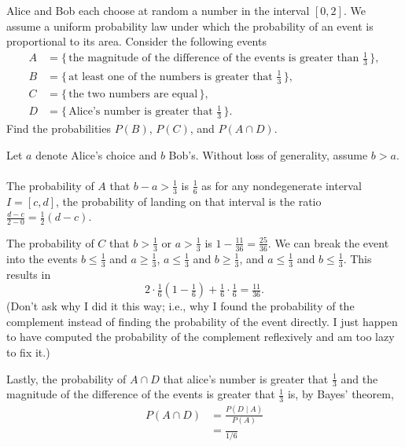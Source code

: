 \begin{problem}
  Alice and Bob each choose at random a number in the interval
  \([0,2]\). We assume a uniform probability law under which the
  probability of an event is proportional to its area. Consider the
  following events
  \begin{align*}
    A&=\bigl\{\,\text{the magnitude of the difference of the events is
       greater than \(\tfrac{1}{3}\)}\,\bigr\},\\
    B&=\bigl\{\,\text{at least one of the numbers is greater that
       \(\tfrac{1}{3}\)}\,\bigr\},\\
    C&=\bigl\{\,\text{the two numbers are equal}\,\bigr\},\\
    D&=\bigl\{\,\text{Alice's number is greater that \(\tfrac{1}{3}\)}\,\bigr\}.
  \end{align*}
  Find the probabilities \(P(B)\), \(P(C)\), and \(P(A\cap D)\).
\end{problem}
\begin{solution*}
  Let \(a\) denote Alice's choice and \(b\) Bob's. Without loss of
  generality, assume \(b>a\).
  \\\\
  The probability of \(A\) that \(b-a>\frac{1}{3}\) is \(\frac{1}{6}\) as
  for any nondegenerate interval \(I=[c,d]\), the probability of landing on
  that interval is the ratio \(\frac{d-c}{2-0}=\frac{1}{2}(d-c)\).

  The probability of \(C\) that \(b>\frac{1}{3}\) or \(a>\frac{1}{3}\) is
  \(1-\frac{11}{36}=\frac{25}{36}\). We can break the event into the events
  \(b\leq\frac{1}{3}\) and \(a\geq\frac{1}{3}\), \(a\leq\frac{1}{3}\) and
  \(b\geq\frac{1}{3}\), and \(a\leq\frac{1}{3}\) and
  \(b\leq\frac{1}{3}\). This results in
  \[
    2\cdot\tfrac{1}{6}(1-\tfrac{1}{6})+\tfrac{1}{6}\cdot \tfrac{1}{6}
    =\tfrac{11}{36}.
  \]
  (Don't ask why I did it this way; i.e., why I found the probability of
  the complement instead of finding the probability of the event
  directly. I just happen to have computed the probability of the
  complement reflexively and am too lazy to fix it.)

  Lastly, the probability of \(A\cap D\) that alice's number is greater
  that \(\frac{1}{3}\) and the magnitude of the difference of the events is
  greater that \(\frac{1}{3}\) is, by Bayes' theorem,
  \begin{align*}
    P(A\cap D)
    &=\frac{P(D\mid A)}{P(A)}\\
    &=\frac{}{1/6}
  \end{align*}
\end{solution*}

